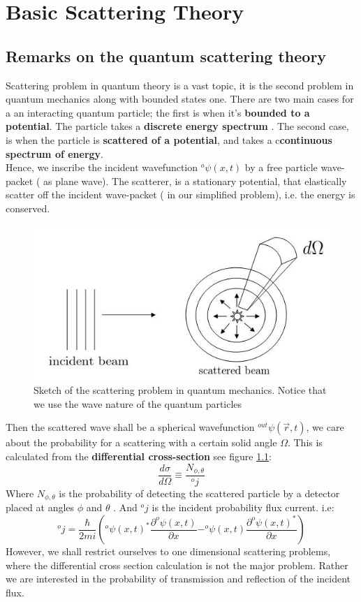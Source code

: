 \chapter{ Basic Scattering Theory}
\section{Remarks on the quantum scattering theory}
Scattering problem in quantum theory is a vast topic, it is the second problem in quantum mechanics along with bounded states one. There are two main cases for a an interacting quantum particle; the first is when it's \textbf{bounded to a potential}. The particle takes a \textbf{discrete energy spectrum }. The second case, is when the particle is \textbf{scattered of a potential}, and takes a c\textbf{continuous spectrum of energy}.\\  Hence, we inscribe the incident wavefunction $ ^o \psi(x,t)$ by a free particle wave-packet ( as plane wave). The scatterer, is a stationary potential, that elastically scatter off the incident wave-packet ( in our simplified problem), i.e. the energy is conserved.
\begin{figure}[h!]
	\centering
	\label{scat}
	\includegraphics[scale=0.6]{./figures/Scattering}
	\caption{Sketch of the scattering problem in quantum mechanics. Notice that we use the wave nature of the quantum particles} 
\end{figure}
Then the scattered wave shall be a spherical wavefunction $^{out} \psi(\vec{r},t)$, we care about the probability for a scattering with a certain solid angle $\Omega$. This is calculated from the\textbf{ differential cross-section} see figure \ref{scat}:
\begin{equation}
\frac{d \sigma}{d \Omega}\equiv \frac{N_{\phi ,\theta}}{^oj}
\end{equation}
Where $N_{\phi ,\theta}$ is the probability of detecting the scattered particle by a detector placed at angles $ \phi$ and $ \theta$ . And $ ^oj$ is the incident probability flux current. i.e:
\begin{equation}
^oj = \frac{\hbar}{2mi} \left( ^o \psi(x,t)^* \frac{\partial ^o \psi(x,t)}{\partial x}- ^o \psi(x,t) \frac{\partial ^o \psi(x,t)^*}{\partial x}\right) 
\label{current}
\end{equation} 
However, we shall restrict ourselves to one dimensional scattering problems, where the differential cross section calculation is not the major problem. Rather we are interested in the probability of transmission and reflection of the incident flux. 
